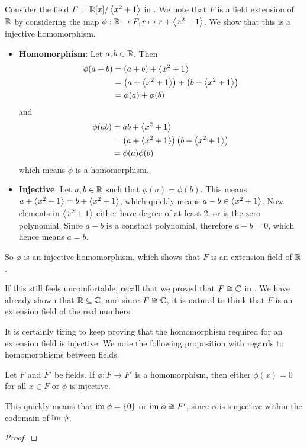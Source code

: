 \begin{example}
    Consider the field $F = \mathbb{R}[x]/\left\langle x^2+1\right\rangle$ in . We note that $F$ is a field extension of $\mathbb{R}$ by considering the map $\phi: \mathbb{R} \to F, r \mapsto r + \left\langle x^2+1\right\rangle$. We show that this is a injective homomorphism.
    \begin{itemize}
        \item \textbf{Homomorphism}: Let $a, b \in \mathbb{R}$. Then
        \begin{align*}
            \phi(a + b) &= (a + b) + \left\langle x^2+1\right\rangle\\
            &= \left(a + \left\langle x^2+1\right\rangle\right) + \left(b + \left\langle x^2+1\right\rangle\right)\\
            &= \phi(a) + \phi(b)
        \end{align*}
        and
        \begin{align*}
            \phi(ab) &= ab + \left\langle x^2+1\right\rangle\\
            &= \left(a + \left\langle x^2+1\right\rangle\right)\left(b + \left\langle x^2+1\right\rangle\right)\\
            &= \phi(a)\phi(b)
        \end{align*}
        which means $\phi$ is a homomorphism.

        \item \textbf{Injective}: Let $a, b \in \mathbb{R}$ such that $\phi(a) = \phi(b)$. This means $a + \left\langle x^2+1\right\rangle = b + \left\langle x^2+1\right\rangle$, which quickly means $a - b \in \left\langle x^2+1\right\rangle$. Now elements in $\left\langle x^2+1\right\rangle$ either have degree of at least 2, or is the zero polynomial. Since $a-b$ is a constant polynomial, therefore $a - b = 0$, which hence means $a = b$.
    \end{itemize}
    So $\phi$ is an injective homomorphism, which shows that $F$ is an extension field of $\mathbb{R}$.

    If this still feels uncomfortable, recall that we proved that $F \cong \mathbb{C}$ in . We have already shown that $\mathbb{R} \subseteq \mathbb{C}$, and since $F \cong \mathbb{C}$, it is natural to think that $F$ is an extension field of the real numbers.
\end{example}

It is certainly tiring to keep proving that the homomorphism required for an extension field is injective. We note the following proposition with regards to homomorphisms between fields.
\begin{proposition}
    Let $F$ and $F'$ be fields. If $\phi: F \to F'$ is a homomorphism, then either $\phi(x) = 0$ for all $x \in F$ or $\phi$ is injective.
\end{proposition}
\begin{remark}
    This quickly means that $\mathrm{im}\; \phi = \{0\}$ or $\mathrm{im}\; \phi \cong F'$, since $\phi$ is surjective within the codomain of $\mathrm{im}\; \phi$.
\end{remark}
\begin{proof}
\end{proof}

